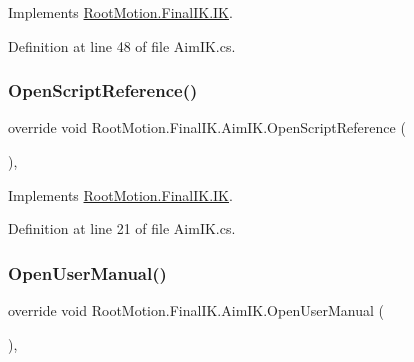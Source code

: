 Implements \mbox{\hyperlink{class_root_motion_1_1_final_i_k_1_1_i_k_ad9ef393e69cd16ba2d6fa06ba06b7a66}{Root\+Motion.\+Final\+I\+K.\+IK}}.



Definition at line 48 of file Aim\+I\+K.\+cs.

\mbox{\label{class_root_motion_1_1_final_i_k_1_1_aim_i_k_a0e574684809fdcb9dcd2a972ecc94871}} 
\subsubsection{\texorpdfstring{Open\+Script\+Reference()}{OpenScriptReference()}}
{\footnotesize\ttfamily override void Root\+Motion.\+Final\+I\+K.\+Aim\+I\+K.\+Open\+Script\+Reference (\begin{DoxyParamCaption}{ }\end{DoxyParamCaption})\hspace{0.3cm}{\ttfamily [protected]}, {\ttfamily [virtual]}}



Implements \mbox{\hyperlink{class_root_motion_1_1_final_i_k_1_1_i_k_a260f283903b1305b99485c9474c83927}{Root\+Motion.\+Final\+I\+K.\+IK}}.



Definition at line 21 of file Aim\+I\+K.\+cs.

\mbox{\label{class_root_motion_1_1_final_i_k_1_1_aim_i_k_afdd0f041a17867eb9ea3bdfcabf273c7}} 
\subsubsection{\texorpdfstring{Open\+User\+Manual()}{OpenUserManual()}}
{\footnotesize\ttfamily override void Root\+Motion.\+Final\+I\+K.\+Aim\+I\+K.\+Open\+User\+Manual (\begin{DoxyParamCaption}{ }\end{DoxyParamCaption})\hspace{0.3cm}{\ttfamily [protected]}, {\ttfamily [virtual]}}



